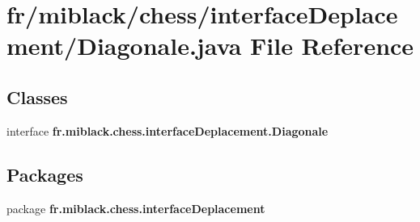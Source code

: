 \section{fr/miblack/chess/interface\-Deplacement/\-Diagonale.java File Reference}
\label{Diagonale_8java}
\subsection*{Classes}
\begin{DoxyCompactItemize}
\item 
interface {\bf fr.\-miblack.\-chess.\-interface\-Deplacement.\-Diagonale}
\end{DoxyCompactItemize}
\subsection*{Packages}
\begin{DoxyCompactItemize}
\item 
package {\bf fr.\-miblack.\-chess.\-interface\-Deplacement}
\end{DoxyCompactItemize}
